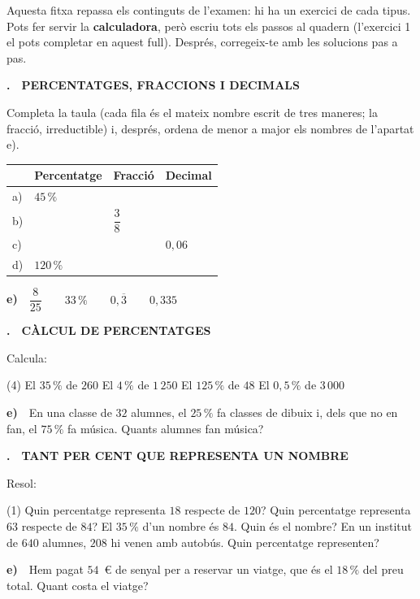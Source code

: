 \documentclass[11pt,a4paper]{article}
\newcounter{exer}
\newcommand{\ex}[2]{\par\needspace{5\baselineskip}\bigskip\stepcounter{exer}\noindent
  {\color{cursfosc}\bfseries\theexer.}\ \ {\scriptsize\bfseries\color{curs}\MakeUppercase{#1}}\par\nopagebreak\smallskip
  \noindent #2\par}
\begin{document}
\thispagestyle{primera}

\vspace{8pt}

\begin{tcolorbox}[colback=soft,colframe=soft,arc=2mm,left=3mm,right=3mm,top=1.5mm,bottom=1.5mm]
\small Aquesta fitxa repassa els continguts de l'examen: hi ha un exercici de cada tipus. Pots fer servir la \textbf{calculadora}, però escriu tots els passos al quadern (l'exercici 1 el pots completar en aquest full). Després, corregeix-te amb les solucions pas a pas.
\end{tcolorbox}

\ex{Percentatges, fraccions i decimals}{Completa la taula (cada fila és el mateix nombre escrit de tres maneres; la fracció, irreductible) i, després, ordena de menor a major els nombres de l'apartat e).}
\smallskip
{\renewcommand{\arraystretch}{1.8}\centering
\begin{tabular}{|C{0.6cm}|C{3.6cm}|C{3.6cm}|C{3.6cm}|}
\hline
{} & \textbf{Percentatge} & \textbf{Fracció} & \textbf{Decimal} \\ \hline
a) & $45\,\%$ & & \\ \hline
b) & & $\dfrac38$ & \\ \hline
c) & & & $0,06$ \\ \hline
d) & $120\,\%$ & & \\ \hline
\end{tabular}\par}

\smallskip
{\color{navy}\bfseries e)}\ \ $\dfrac{8}{25}\qquad 33\,\%\qquad 0,\overline{3}\qquad 0,335$

\ex{Càlcul de percentatges}{Calcula:}
\begin{tasks}(4)
  \task El $35\,\%$ de $260$
  \task El $4\,\%$ de $1\,250$
  \task El $125\,\%$ de $48$
  \task El $0,5\,\%$ de $3\,000$
\end{tasks}
{\color{navy}\bfseries e)}\ \ En una classe de $32$ alumnes, el $25\,\%$ fa classes de dibuix i, dels que no en fan, el $75\,\%$ fa música. Quants alumnes fan música?

\ex{Tant per cent que representa un nombre}{Resol:}
\begin{tasks}(1)
  \task Quin percentatge representa $18$ respecte de $120$?
  \task Quin percentatge representa $63$ respecte de $84$?
  \task El $35\,\%$ d'un nombre és $84$. Quin és el nombre?
  \task En un institut de $640$ alumnes, $208$ hi venen amb autobús. Quin percentatge representen?
\end{tasks}
{\color{navy}\bfseries e)}\ \ Hem pagat $54$~€ de senyal per a reservar un viatge, que és el $18\,\%$ del preu total. Quant costa el viatge?
\end{document}
